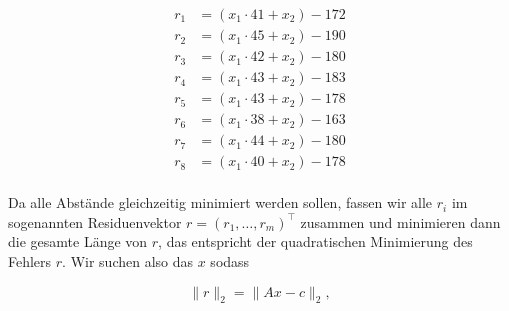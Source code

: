 \begin{figure*}[h]
\begin{minipage}
    \end{minipage}    
    \hfill
    \begin{minipage}
        {0.29\textwidth}
        \centering
        \begin{equation*}
            \begin{aligned}
                r_1 &= (x_1\cdot 41 + x_2) - 172 \\
                r_2 &= (x_1\cdot 45 + x_2) - 190 \\
                r_3 &= (x_1\cdot 42 + x_2) - 180 \\
                r_4 &= (x_1\cdot 43 + x_2) - 183 \\
                r_5 &= (x_1\cdot 43 + x_2) - 178 \\
                r_6 &= (x_1\cdot 38 + x_2) - 163 \\
                r_7 &= (x_1\cdot 44 + x_2) - 180 \\
                r_8 &= (x_1\cdot 40 + x_2) - 178 \\
            \end{aligned}
        \end{equation*}
    \end{minipage}
\end{figure*}

Da alle Abstände gleichzeitig minimiert werden sollen, fassen wir alle \( r_i \) im sogenannten Residuenvektor \( r = (r_1, \dots, r_m)^\top \) zusammen und minimieren dann die gesamte Länge von \( r \), das entspricht der quadratischen Minimierung des Fehlers \( r \). Wir suchen also das \( x \) sodass

\begin{equation*}
    \lVert r \rVert_2 = \lVert A x - c \rVert_2,
\end{equation*}

